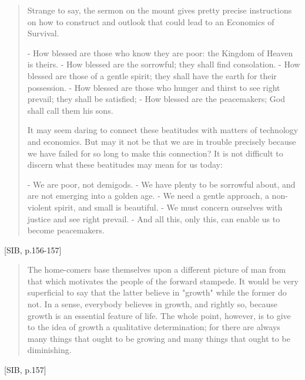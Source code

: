 \begin{quote}
  Strange to say, the sermon on the mount gives pretty precise instructions on how to construct and outlook that could lead to an Economics of Survival.

  - How blessed are those who know they are poor: the Kingdom of Heaven is theirs.
  - How blessed are the sorrowful; they shall find consolation.
  - How blessed are those of a gentle spirit; they shall have the earth for their possession.
  - How blessed are those who hunger and thirst to see right prevail; they shall be satisfied;
  - How blessed are the peacemakers; God shall call them his sons.

  It may seem daring to connect these beatitudes with matters of technology and economics. But may it not be that we are in trouble precisely because we have failed for so long to make this connection? It is not difficult to discern what these beatitudes may mean for us today:

  - We are poor, not demigods.
  - We have plenty to be sorrowful about, and are not emerging into a golden age.
  - We need a gentle approach, a non-violent spirit, and small is beautiful.
  - We must concern ourselves with justice and see right prevail.
  - And all this, only this, can enable us to become peacemakers.
\end{quote}[SIB, p.156-157]

\begin{quote}
  The home-comers base themselves upon a different picture of man from that which motivates the people of the forward stampede. It would be very superficial to say that the latter believe in "growth" while the former do not. In a sense, everybody believes in growth, and rightly so, because growth is an essential feature of life. The whole point, however, is to give to the idea of growth a qualitative determination; for there are always many things that ought to be growing and many things that ought to be diminishing.
\end{quote}[SIB, p.157]

